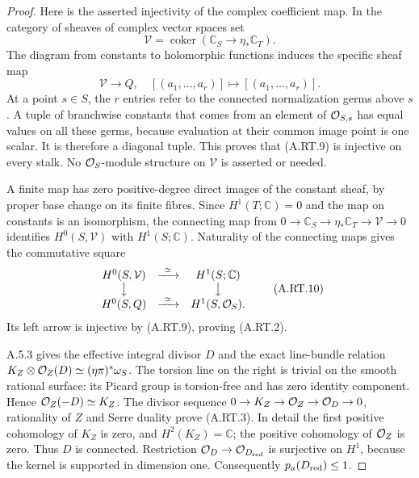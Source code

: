 \begin{proof}
Here is the asserted injectivity of the complex coefficient map.
In the category of sheaves of complex vector spaces set
\[
 \mathcal V=\operatorname{coker}
     (\mathbb C_S\longrightarrow\eta_*\mathbb C_T).
\]
The diagram from constants to holomorphic functions induces the
specific sheaf map
\[
 \mathcal V\longrightarrow Q,
 \quad[(a_1,\ldots,a_r)]\longmapsto[(a_1,\ldots,a_r)] .
\tag{A.RT.9}
\]
At a point $s\in S$, the $r$ entries refer to the connected
normalization germs above $s$. A tuple of branchwise constants
that comes from an element of $\mathcal O_{S,s}$ has equal values on
all these germs, because evaluation at their common image point
is one scalar. It is therefore a diagonal tuple. This proves
that (A.RT.9) is injective on every stalk. No $\mathcal O_S$-module
structure on $\mathcal V$ is asserted or needed.

A finite map has zero positive-degree direct images of the
constant sheaf, by proper base change on its finite fibres.
Since $H^1(T;\mathbb C)=0$ and the map on constants is an
isomorphism, the connecting map from
$0\to\mathbb C_S\to\eta_*\mathbb C_T\to\mathcal V\to0$
identifies $H^0(S,\mathcal V)$ with $H^1(S;\mathbb C)$.
Naturality of the connecting maps gives the commutative square
\[
\begin{array}{ccc}
 H^0(S,\mathcal V)&\xrightarrow{\ \simeq\ }&H^1(S;\mathbb C)\\
 \big\downarrow&&\big\downarrow\\
 H^0(S,Q)&\xrightarrow{\ \simeq\ }&H^1(S,\mathcal O_S).
\end{array}
\tag{A.RT.10}
\]
Its left arrow is injective by (A.RT.9), proving (A.RT.2).

A.5.3 gives the effective integral divisor $D$ and the exact
line-bundle relation
$K_Z\otimes\mathcal O_Z(D)\simeq(\eta\pi)^*\omega_S$.
The torsion line on the right is trivial on the smooth rational
surface: its Picard group is torsion-free and has zero identity
component. Hence $\mathcal O_Z(-D)\simeq K_Z$. The divisor sequence
$0\to K_Z\to\mathcal O_Z\to\mathcal O_D\to0$, rationality of $Z$ and
Serre duality prove (A.RT.3). In detail the first positive
cohomology of $K_Z$ is zero, and $H^2(K_Z)=\mathbb C$;
the positive cohomology of $\mathcal O_Z$ is zero. Thus $D$ is
connected. Restriction $\mathcal O_D\to\mathcal O_{D_{\rm red}}$ is
surjective on $H^1$, because the kernel is supported in
dimension one. Consequently $p_a(D_{\rm red})\le1$.


\end{proof}
